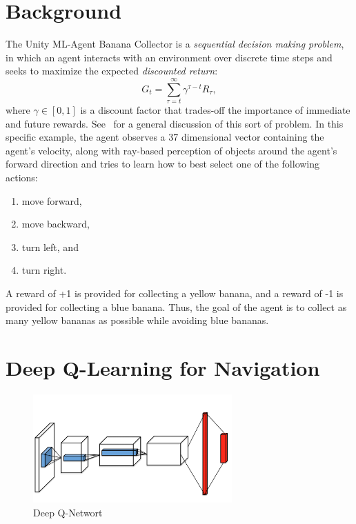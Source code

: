 \documentclass[tog]{acmsiggraph}
\begin{document}
\section{Background}

The Unity ML-Agent Banana Collector is a {\em sequential decision making problem}, in which an agent interacts with an environment over discrete time
steps and seeks to maximize the expected {\em discounted return}:
$$G_t = \sum_{\tau=t}^{\infty}\gamma^{\tau-t}R_\tau,$$
where $\gamma\in[0,1]$  is a discount factor that trades-off the importance of immediate and future rewards.
See~\cite{DBLP:books/lib/SuttonB98} for a general discussion of this sort of problem. 
In this specific example, the agent observes a 37 dimensional vector containing the agent's velocity, along with ray-based perception of 
objects around the agent's forward direction and tries to learn how to best select one of the following actions:
\begin{enumerate}
	\item move forward,
	\item move backward,
	\item turn left, and
	\item turn right.
\end{enumerate}
A reward of +1 is provided for collecting a yellow banana, and a reward of -1 is provided for collecting a blue banana.
Thus, the goal of the agent is to collect as many yellow bananas as possible while avoiding blue bananas.

\section{ Deep Q-Learning for Navigation}

\begin{figure}[h]
	\centering
	\includegraphics[width=3.0in]{images/dqn}
	\caption{Deep Q-Networt~\protect\cite{DBLP:journals/corr/WangFL15}}
	\label{fig:dqn}
\end{figure}
\end{document}
